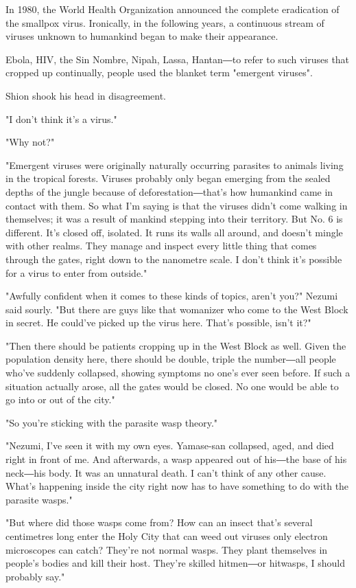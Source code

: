In 1980, the World Health Organization announced the complete
eradication of the smallpox virus. Ironically, in the following years, a
continuous stream of viruses unknown to humankind began to make their
appearance.

Ebola, HIV, the Sin Nombre, Nipah, Lassa, Hantan―to refer to such
viruses that cropped up continually, people used the blanket term
"emergent viruses".

Shion shook his head in disagreement.

"I don't think it's a virus."

"Why not?"

"Emergent viruses were originally naturally occurring parasites to
animals living in the tropical forests. Viruses probably only began
emerging from the sealed depths of the jungle because of
deforestation―that's how humankind came in contact with them. So what
I'm saying is that the viruses didn't come walking in themselves; it was
a result of mankind stepping into their territory. But No. 6 is
different. It's closed off, isolated. It runs its walls all around, and
doesn't mingle with other realms. They manage and inspect every little
thing that comes through the gates, right down to the nanometre scale. I
don't think it's possible for a virus to enter from outside."

"Awfully confident when it comes to these kinds of topics, aren't you?"
Nezumi said sourly. "But there are guys like that womanizer who come to
the West Block in secret. He could've picked up the virus here. That's
possible, isn't it?"

"Then there should be patients cropping up in the West Block as well.
Given the population density here, there should be double, triple the
number―all people who've suddenly collapsed, showing symptoms no one's
ever seen before. If such a situation actually arose, all the gates
would be closed. No one would be able to go into or out of the city."

"So you're sticking with the parasite wasp theory."

"Nezumi, I've seen it with my own eyes. Yamase-san collapsed, aged, and
died right in front of me. And afterwards, a wasp appeared out of
his―the base of his neck―his body. It was an unnatural death. I can't
think of any other cause. What's happening inside the city right now has
to have something to do with the parasite wasps."

"But where did those wasps come from? How can an insect that's several
centimetres long enter the Holy City that can weed out viruses only
electron microscopes can catch? They're not normal wasps. They plant
themselves in people's bodies and kill their host. They're skilled
hitmen―or hitwasps, I should probably say."

